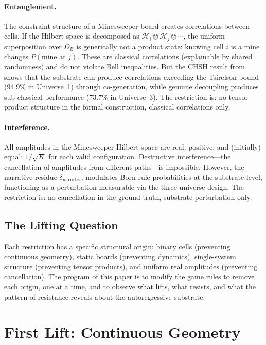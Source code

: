 \documentclass[12pt,a4paper]{article}
\theoremstyle{definition}
\theoremstyle{remark}
\newcommand{\Hil}{\mathcal{H}}
\newcommand{\Conf}{\Omega}
\begin{document}
\paragraph{Entanglement.}
The constraint structure of a Minesweeper board creates correlations between cells.  If the Hilbert space is decomposed as $\Hil_{i} \otimes \Hil_{j} \otimes \cdots$, the uniform superposition over $\Conf_B$ is generically not a product state: knowing cell $i$ is a mine changes $P(\text{mine at } j)$.  These are classical correlations (explainable by shared randomness) and do not violate Bell inequalities.  But the CHSH result from \citet{Baldo2026Rosencrantz} shows that the substrate can produce correlations exceeding the Tsirelson bound (94.9\% in Universe~1) through co-generation, while genuine decoupling produces sub-classical performance (73.7\% in Universe~3).  The restriction is: no tensor product structure in the formal construction, classical correlations only.

\paragraph{Interference.}
All amplitudes in the Minesweeper Hilbert space are real, positive, and (initially) equal: $1/\sqrt{K}$ for each valid configuration.  Destructive interference---the cancellation of amplitudes from different paths---is impossible.  However, the narrative residue $\delta_{\text{narrative}}$ modulates Born-rule probabilities at the substrate level, functioning as a perturbation measurable via the three-universe design.  The restriction is: no cancellation in the ground truth, substrate perturbation only.

\subsection{The Lifting Question}

Each restriction has a specific structural origin: binary cells (preventing continuous geometry), static boards (preventing dynamics), single-system structure (preventing tensor products), and uniform real amplitudes (preventing cancellation).  The program of this paper is to modify the game rules to remove each origin, one at a time, and to observe what lifts, what resists, and what the pattern of resistance reveals about the autoregressive substrate.


\section{First Lift: Continuous Geometry}
\label{sec:continuous}
\end{document}
